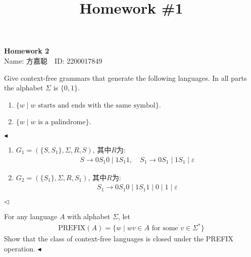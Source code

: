 \documentclass[11pt]{article}
\title{Homework \#1}
\newenvironment{problem}[2][Problem]{\begin{trivlist}
\item[\hskip \labelsep{\bfseries#1}\hskip\labelsep{\bfseries#2.}]}{\hfill$\blacktriangleleft$\end{trivlist}}
\newenvironment{answer}[1][Answer]{\begin{trivlist}
\item[\hskip \labelsep{\bfseries\itshape#1.}\hskip \labelsep]}{\hfill$\lhd$\end{trivlist}}
\begin{document}
\kaishu

\pagestyle{fancy}
\chead{}

\begin{center}
    {\LARGE \bf Homework 2}\\
    {Name: 方嘉聪\ \  ID: 2200017849}            %
\end{center}

\begin{problem}{1.(12 points)}
    Give context-free grammars that generate the following languages. In all parts the alphabet $\Sigma$ is $\{0, 1\}$.
    \begin{enumerate}[label = (\alph*)]
        \item $\{w \mid w \text{ starts and ends with the same symbol}\}$.
        \item $\{w \mid w \text{ is a palindrome}\}$.
    \end{enumerate}
\end{problem}
\begin{answer}
    \begin{enumerate}[label = (\alph*)]
        \item $G_1 = \left(\{S, S_1\}, \Sigma, R, S\right)$, 其中$R$为:
        \begin{align*}
            S \rightarrow 0S_1 0 \mid 1 S_1 1, \quad S_1 \rightarrow 0S_1 \mid 1S_1 \mid \varepsilon
        \end{align*}
        \item $G_2 = \left(\{S_1\}, \Sigma, R, S_1\right)$, 其中$R$为:
        \begin{align*}
            S_1 \rightarrow 0S_1 0 \mid 1 S_1 1 \mid 0\mid 1\mid \varepsilon
        \end{align*}
    \end{enumerate}
\end{answer}
\begin{problem}{2.(12 points)}
    For any language $A$ with alphabet $\Sigma$, let 
    \begin{align*}
        \text{PREFIX}(A) = \{w \mid wv \in A \text{ for some } v \in \Sigma^*\}
    \end{align*}
Show that the class of context-free languages is closed under the PREFIX operation.
\end{problem}
\end{document}
